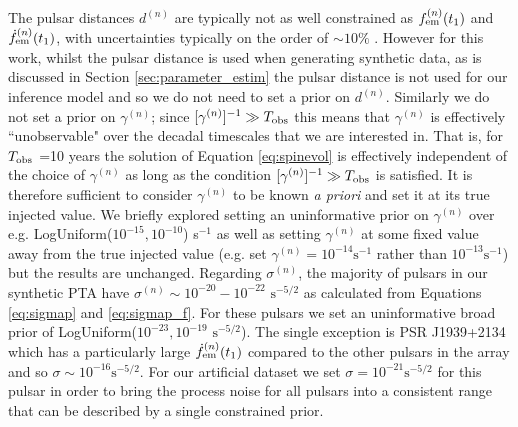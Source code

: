 \documentclass[fleqn,usenatbib,useAMS]{mnras}
\begin{document}
The pulsar distances $d^{(n)}$ are typically not as well constrained as $f_{\rm em}^{(n)} (t_1)$ and $\dot{f}_{\rm em}^{(n)} (t_1)$, with uncertainties typically on the order of $\sim 10 \%$ \citep{Arzoumanian2018ApJS..235...37A,Yao2017}. However for this work, whilst the pulsar distance is used when generating synthetic data, as is discussed in Section \ref{sec:parameter_estim} the pulsar distance is not used for our inference model and so we do not need to set a prior on $d^{(n)}$. Similarly we do not set a prior on $\gamma^{(n)}$; since $[\gamma^{(n)}]^{-1} \gg T_{\rm obs}$ this means that $\gamma^{(n)}$ is effectively ``unobservable" over the decadal timescales that we are interested in. That is, for $T_{\rm obs}$ =10 years the solution of Equation \eqref{eq:spinevol} is effectively independent of the choice of $\gamma^{(n)}$ as long as the condition $[\gamma^{(n)}]^{-1} \gg T_{\rm obs}$ is satisfied. It is therefore sufficient to consider $\gamma^{(n)}$ to be known \textit{a priori} and set it at its true injected value. We briefly explored setting an uninformative prior on $\gamma^{(n)}$ over e.g. LogUniform($10^{-15}, 10^{-10}$) s$^{-1}$ as well as setting $\gamma^{(n)}$ at some fixed value away from the true injected value (e.g. set $\gamma^{(n)} = 10^{-14} \text{s}^{-1}$ rather than $10^{-13} \text{s}^{-1}$) but the results are unchanged. Regarding $\sigma^{(n)}$, the majority of pulsars in our synthetic PTA have $\sigma^{(n)} \sim 10^{-20} - 10^{-22} \text{ s}^{-5/2}$ as calculated from Equations \eqref{eq:sigmap} and \eqref{eq:sigmap_f}. For these pulsars we set an uninformative broad prior of LogUniform($10^{-23}, 10^{-19}$ $\text{s}^{-5/2}$). The single exception is PSR J1939+2134 which has a particularly large $\dot{f}_{\rm em}^{(n)} (t_1)$ compared to the other pulsars in the array and so $\sigma \sim 10^{-16} \text{s}^{-5/2}$. For our artificial dataset we set $\sigma = 10^{-21} \text{s}^{-5/2}$ for this pulsar in order to bring the process noise for all pulsars into a consistent range that can be described by a single constrained prior. \newline 
\end{document}
